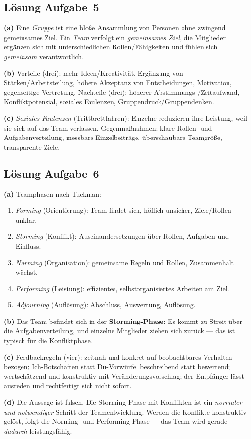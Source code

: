 \documentclass[11pt, a4paper]{article}
\begin{document}
\subsection*{Lösung Aufgabe~5}
\begin{loesung}
\textbf{(a)} Eine \emph{Gruppe} ist eine bloße Ansammlung von Personen ohne zwingend
gemeinsames Ziel. Ein \emph{Team} verfolgt ein \emph{gemeinsames Ziel}, die Mitglieder
ergänzen sich mit unterschiedlichen Rollen/Fähigkeiten und fühlen sich \emph{gemeinsam}
verantwortlich.

\textbf{(b)} Vorteile (drei): mehr Ideen/Kreativität, Ergänzung von Stärken/Arbeitsteilung,
höhere Akzeptanz von Entscheidungen, Motivation, gegenseitige Vertretung.
Nachteile (drei): höherer Abstimmungs-/Zeitaufwand, Konfliktpotenzial, soziales Faulenzen,
Gruppendruck/Gruppendenken.

\textbf{(c)} \emph{Soziales Faulenzen} (Trittbrettfahren): Einzelne reduzieren ihre
Leistung, weil sie sich auf das Team verlassen. Gegenmaßnahmen: klare Rollen- und
Aufgabenverteilung, messbare Einzelbeiträge, überschaubare Teamgröße, transparente Ziele.
\end{loesung}

\subsection*{Lösung Aufgabe~6}
\begin{loesung}
\textbf{(a)} Teamphasen nach Tuckman:
\begin{enumerate}[label=\arabic*., itemsep=0pt]
  \item \emph{Forming} (Orientierung): Team findet sich, höflich-unsicher, Ziele/Rollen
    unklar.
  \item \emph{Storming} (Konflikt): Auseinandersetzungen über Rollen, Aufgaben und Einfluss.
  \item \emph{Norming} (Organisation): gemeinsame Regeln und Rollen, Zusammenhalt wächst.
  \item \emph{Performing} (Leistung): effizientes, selbstorganisiertes Arbeiten am Ziel.
  \item \emph{Adjourning} (Auflösung): Abschluss, Auswertung, Auflösung.
\end{enumerate}

\textbf{(b)} Das Team befindet sich in der \textbf{Storming-Phase}: Es kommt zu Streit
über die Aufgabenverteilung, und einzelne Mitglieder ziehen sich zurück --- das ist
typisch für die Konfliktphase.

\textbf{(c)} Feedbackregeln (vier): zeitnah und konkret auf beobachtbares Verhalten
bezogen; Ich-Botschaften statt Du-Vorwürfe; beschreibend statt bewertend; wertschätzend
und konstruktiv mit Veränderungsvorschlag; der Empfänger lässt ausreden und rechtfertigt
sich nicht sofort.

\textbf{(d)} Die Aussage ist falsch. Die Storming-Phase mit Konflikten ist ein
\emph{normaler und notwendiger} Schritt der Teamentwicklung. Werden die Konflikte
konstruktiv gelöst, folgt die Norming- und Performing-Phase --- das Team wird gerade
\emph{dadurch} leistungsfähig.
\end{loesung}
\end{document}
